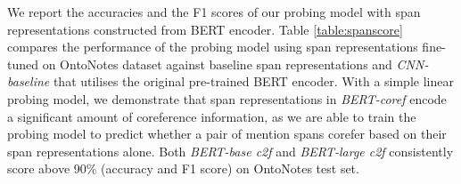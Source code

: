 \documentclass[11pt]{article}
\begin{document}







We report the accuracies and the F1 scores of our probing model with span representations constructed from BERT encoder. Table \ref{table:spanscore} compares the performance of the probing model using span representations fine-tuned on OntoNotes dataset against baseline span representations and \textit{CNN-baseline} that utilises the original pre-trained BERT encoder. With a simple linear probing model, we demonstrate that span representations in \textit{BERT-coref} encode a significant amount of coreference information, as we are able to train the probing model to predict whether a pair of mention spans corefer based on their span representations alone. Both \textit{BERT-base c2f} and \textit{BERT-large c2f} consistently score above 90\% (accuracy and F1 score) on OntoNotes test set. 
\end{document}
